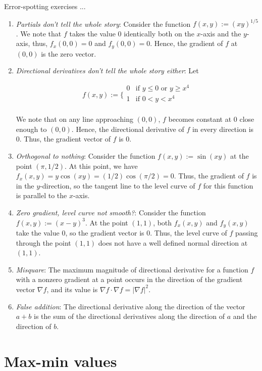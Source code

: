 \documentclass[10pt]{amsart}
\begin{document}
Error-spotting exercises ...

\begin{enumerate}
\item {\em Partials don't tell the whole story}: Consider the function
  $f(x,y) := (xy)^{1/5}$. We note that $f$ takes the value $0$
  identically both on the $x$-axis and the $y$-axis, thus, $f_x(0,0) =
  0$ and $f_y(0,0) = 0$. Hence, the gradient of $f$ at $(0,0)$ is the
  zero vector.
\item {\em Directional derivatives don't tell the whole story either}: Let

  $$f(x,y) := \lbrace\begin{array}{rl} 0 & \text{if } y \le 0 \text{ or } y \ge x^4 \\ 1 & \text{if } 0 < y < x^4 \\\end{array}$$

  We note that on any line approaching $(0,0)$, $f$ becomes constant
  at $0$ close enough to $(0,0)$. Hence, the directional derivative of
  $f$ in every direction is $0$. Thus, the gradient vector of $f$ is $0$.
\item {\em Orthogonal to nothing}: Consider the function $f(x,y) :=
  \sin(xy)$ at the point $(\pi,1/2)$. At this point, we have $f_x(x,y)
  = y\cos(xy) = (1/2)\cos(\pi/2) = 0$. Thus, the gradient of $f$ is in
  the $y$-direction, so the tangent line to the level curve of $f$ for
  this function is parallel to the $x$-axis.
\item {\em Zero gradient, level curve not smooth?}: Consider the
  function $f(x,y) := (x - y)^3$. At the point $(1,1)$, both
  $f_x(x,y)$ and $f_y(x,y)$ take the value $0$, so the gradient vector
  is $0$. Thus, the level curve of $f$ passing through the point
  $(1,1)$ does not have a well defined normal direction at $(1,1)$.
\item {\em Misquare}: The maximum magnitude of directional derivative
  for a function $f$ with a nonzero gradient at a point occurs in the
  direction of the gradient vector $\nabla f$, and its value is
  $\nabla f \cdot \nabla f = |\nabla f|^2$.
\item {\em False addition}: The directional derivative along the
  direction of the vector $a + b$ is the sum of the directional
  derivatives along the direction of $a$ and the direction of $b$.
\end{enumerate}
\section{Max-min values}
\end{document}
